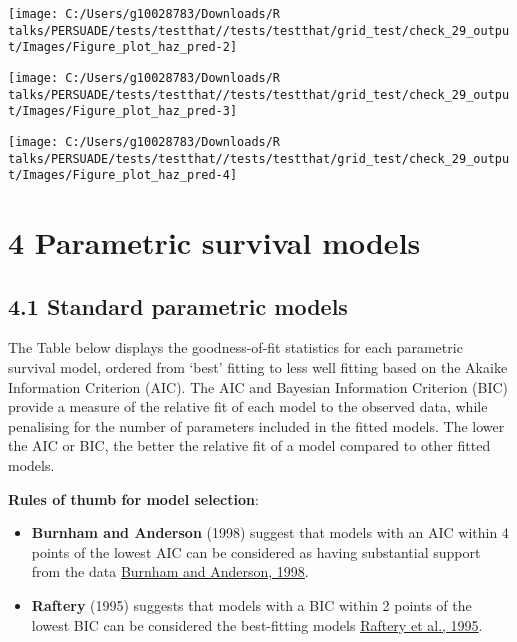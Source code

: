 \documentclass[
]{article}
\providecommand{\tightlist}{%
  \setlength{\itemsep}{0pt}\setlength{\parskip}{0pt}}
\begin{document}
\begin{flushleft}\texttt{[image: C:/Users/g10028783/Downloads/R talks/PERSUADE/tests/testthat//tests/testthat/grid\_test/check\_29\_output/Images/Figure\_plot\_haz\_pred-2]} \end{flushleft}

\begin{flushleft}\texttt{[image: C:/Users/g10028783/Downloads/R talks/PERSUADE/tests/testthat//tests/testthat/grid\_test/check\_29\_output/Images/Figure\_plot\_haz\_pred-3]} \end{flushleft}

\begin{flushleft}\texttt{[image: C:/Users/g10028783/Downloads/R talks/PERSUADE/tests/testthat//tests/testthat/grid\_test/check\_29\_output/Images/Figure\_plot\_haz\_pred-4]} \end{flushleft}

\clearpage

\section{4 Parametric survival models}\label{parametric-survival-models}

\subsection{4.1 Standard parametric
models}\label{standard-parametric-models}

The Table below displays the goodness-of-fit statistics for each
parametric survival model, ordered from `best' fitting to less well
fitting based on the Akaike Information Criterion (AIC). The AIC and
Bayesian Information Criterion (BIC) provide a measure of the relative
fit of each model to the observed data, while penalising for the number
of parameters included in the fitted models. The lower the AIC or BIC,
the better the relative fit of a model compared to other fitted models.

\textbf{Rules of thumb for model selection}:

\begin{itemize}
\tightlist
\item
  \textbf{Burnham and Anderson} (1998) suggest that models with an AIC
  within 4 points of the lowest AIC can be considered as having
  substantial support from the data
  \href{https://doi.org/10.1007/978-1-4757-2917-7}{Burnham and Anderson,
  1998}.\\
\item
  \textbf{Raftery} (1995) suggests that models with a BIC within 2
  points of the lowest BIC can be considered the best-fitting models
  \href{https://doi.org/10.2307/271063}{Raftery et al., 1995}.
\end{itemize}
\end{document}
